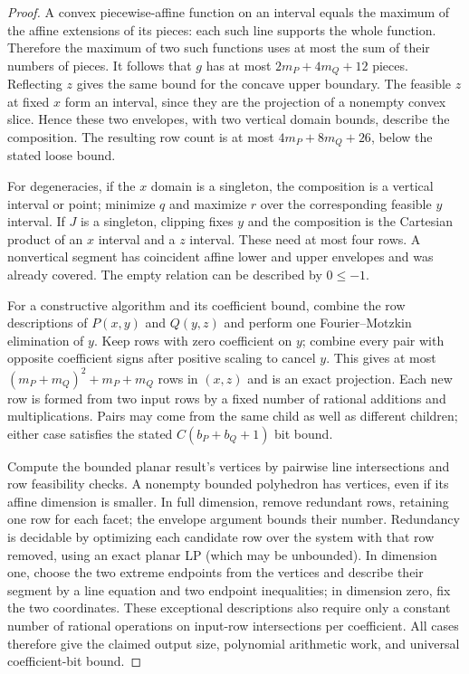 \begin{proof}
A convex piecewise-affine function on an interval equals the maximum
of the affine extensions of its pieces: each such line supports the
whole function. Therefore the maximum of two such functions uses at
most the sum of their numbers of pieces. It follows that $g$ has at
most $2m_P+4m_Q+12$ pieces. Reflecting $z$ gives the same bound for
the concave upper boundary. The feasible $z$ at fixed $x$ form an
interval, since they are the projection of a nonempty convex slice.
Hence these two envelopes, with two vertical domain bounds, describe
the composition. The resulting row count is at most
$4m_P+8m_Q+26$, below the stated loose bound.

For degeneracies, if the $x$ domain is a singleton, the composition
is a vertical interval or point; minimize $q$ and maximize $r$ over
the corresponding feasible $y$ interval. If $J$ is a singleton,
clipping fixes $y$ and the composition is the Cartesian product of
an $x$ interval and a $z$ interval. These need at most four rows.
A nonvertical segment has coincident affine lower and upper envelopes
and was already covered. The empty relation can be described by
$0\le-1$.

For a constructive algorithm and its coefficient bound, combine the
row descriptions of $P(x,y)$ and $Q(y,z)$ and perform one
Fourier--Motzkin elimination of $y$. Keep rows with zero coefficient
on $y$; combine every pair with opposite coefficient signs after
positive scaling to cancel $y$. This gives at most
$(m_P+m_Q)^2+m_P+m_Q$ rows in $(x,z)$ and is an exact projection.
Each new row is formed from two input rows by a fixed number of
rational additions and multiplications. Pairs may come from the
same child as well as different children; either case satisfies the
stated $C(b_P+b_Q+1)$ bit bound.

Compute the bounded planar result's vertices by pairwise line
intersections and row feasibility checks. A nonempty bounded
polyhedron has vertices, even if its affine dimension is smaller.
In full dimension, remove redundant rows, retaining one row for each
facet; the envelope argument bounds their number. Redundancy is
decidable by optimizing each candidate row over the system with that
row removed, using an exact planar LP (which may be unbounded). In dimension one, choose the two extreme endpoints from
the vertices and describe their segment by a line equation and two
endpoint inequalities; in dimension zero, fix the two coordinates.
These exceptional descriptions also require only a constant number
of rational operations on input-row intersections per coefficient.
All cases therefore give the claimed output size, polynomial
arithmetic work, and universal coefficient-bit bound.
\end{proof}

